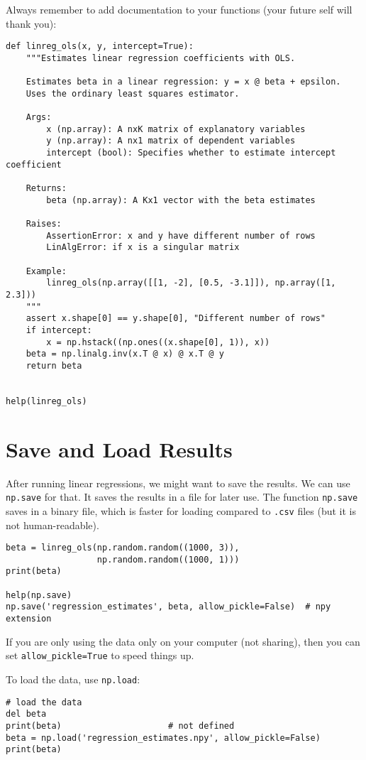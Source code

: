\documentclass[12pt, a4paper]{article}
\begin{document}
Always remember to add documentation to your functions (your future self will thank you):
\lstset{language=jupyter-python,label= ,caption= ,captionpos=b,numbers=none}
\begin{lstlisting}
def linreg_ols(x, y, intercept=True):
    """Estimates linear regression coefficients with OLS.

    Estimates beta in a linear regression: y = x @ beta + epsilon.
    Uses the ordinary least squares estimator.

    Args:
        x (np.array): A nxK matrix of explanatory variables
        y (np.array): A nx1 matrix of dependent variables
        intercept (bool): Specifies whether to estimate intercept coefficient

    Returns:
        beta (np.array): A Kx1 vector with the beta estimates

    Raises:
        AssertionError: x and y have different number of rows
        LinAlgError: if x is a singular matrix

    Example:
        linreg_ols(np.array([[1, -2], [0.5, -3.1]]), np.array([1, 2.3]))
    """
    assert x.shape[0] == y.shape[0], "Different number of rows"
    if intercept:
        x = np.hstack((np.ones((x.shape[0], 1)), x))
    beta = np.linalg.inv(x.T @ x) @ x.T @ y
    return beta


help(linreg_ols)
\end{lstlisting}
\section{Save and Load Results}
\label{sec:orgc2fbcc1}
After running linear regressions, we might want to save the results.
We can use \texttt{np.save} for that.
It saves the results in a file for later use.
The function \texttt{np.save} saves in a binary file, which is faster for loading compared to \texttt{.csv} files (but it is not human-readable).
\lstset{language=jupyter-python,label= ,caption= ,captionpos=b,numbers=none}
\begin{lstlisting}
beta = linreg_ols(np.random.random((1000, 3)),
                  np.random.random((1000, 1)))
print(beta)

help(np.save)
np.save('regression_estimates', beta, allow_pickle=False)  # npy extension
\end{lstlisting}
If you are only using the data only on your computer (not sharing), then you can set \texttt{allow\_pickle=True} to speed things up.

To load the data, use \texttt{np.load}:
\lstset{language=jupyter-python,label= ,caption= ,captionpos=b,numbers=none}
\begin{lstlisting}
# load the data
del beta
print(beta)                     # not defined
beta = np.load('regression_estimates.npy', allow_pickle=False)
print(beta)
\end{lstlisting}
\end{document}
